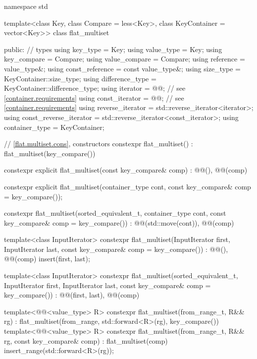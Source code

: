 \begin{codeblock}
namespace std {
  template<class Key, class Compare = less<Key>, class KeyContainer = vector<Key>>
  class flat_multiset {
  public:
    // types
    using key_type                  = Key;
    using value_type                = Key;
    using key_compare               = Compare;
    using value_compare             = Compare;
    using reference                 = value_type&;
    using const_reference           = const value_type&;
    using size_type                 = KeyContainer::size_type;
    using difference_type           = KeyContainer::difference_type;
    using iterator                  = @@;  // see \ref{container.requirements}
    using const_iterator            = @@;  // see \ref{container.requirements}
    using reverse_iterator          = std::reverse_iterator<iterator>;
    using const_reverse_iterator    = std::reverse_iterator<const_iterator>;
    using container_type            = KeyContainer;

    // \ref{flat.multiset.cons}, constructors
    constexpr flat_multiset() : flat_multiset(key_compare()) { }

    constexpr explicit flat_multiset(const key_compare& comp)
      : @@(), @@(comp) { }

    constexpr explicit flat_multiset(container_type cont,
                                     const key_compare& comp = key_compare());

    constexpr flat_multiset(sorted_equivalent_t, container_type cont,
                            const key_compare& comp = key_compare())
      : @@(std::move(cont)), @@(comp) { }

    template<class InputIterator>
      constexpr flat_multiset(InputIterator first, InputIterator last,
                              const key_compare& comp = key_compare())
        : @@(), @@(comp)
        { insert(first, last); }

    template<class InputIterator>
      constexpr flat_multiset(sorted_equivalent_t, InputIterator first, InputIterator last,
                              const key_compare& comp = key_compare())
        : @@(first, last), @@(comp) { }

    template<@@<value_type> R>
      constexpr flat_multiset(from_range_t, R&& rg)
        : flat_multiset(from_range, std::forward<R>(rg), key_compare()) { }
    template<@@<value_type> R>
      constexpr flat_multiset(from_range_t, R&& rg, const key_compare& comp)
        : flat_multiset(comp)
        { insert_range(std::forward<R>(rg)); }

}}
\end{codeblock}
